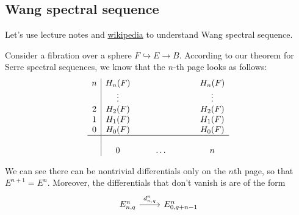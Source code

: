 \begin{remark}
\begin{defn}
\subsection{Wang spectral sequence}

Let's use lecture notes and \href{https://en.wikipedia.org/wiki/Spectral_sequence#Wang_sequence}{wikipedia} to understand Wang spectral sequence.

Consider a fibration over a sphere $F\hookrightarrow E\to B$. According to our theorem for Serre spectral sequences, we know that the $n$-th page looks as follows:
\begin{align*}
\begin{array}{c|cccccccc}
	n&H_n(F)&&&&&&&H_{n}(F)\\
	 &\vdots&&&&&&&\vdots\\
	2&H_2(F)&&&&&&&H_2(F)\\
	1&H_1(F)&&&&&&&H_1(F)\\
	0&H_0(F)&&&&&&&H_0(F)\\
	\hline\\
	 &0&&&\ldots&&&&n
\end{array}
\end{align*}

We can see there can be nontrivial differentials only on the $n$th page, so that $E^{n+1}=E^n$. Moreover, the differentials that don't vanish is are of the form
\[\begin{tikzcd}
E^n_{n,q}\arrow[r,"d^n_{n,q}"]&E^n_{0,q+n-1}
\end{tikzcd}\]


\end{defn}
\end{remark}
